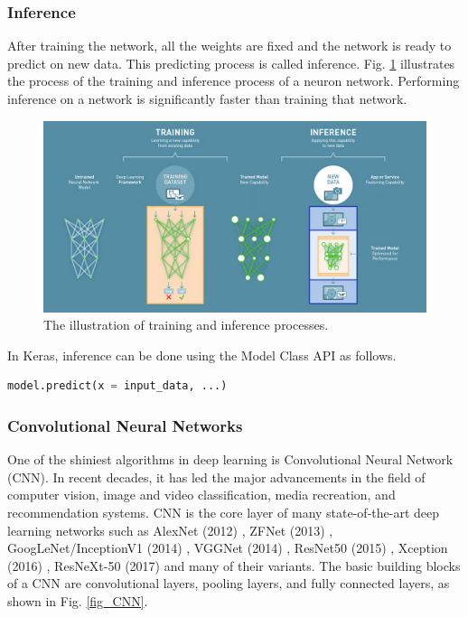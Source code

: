 \subsubsection{Inference}
After training the network, all the weights are fixed and the network is ready to predict on new data. This predicting process is called inference. Fig. \ref{fig_train_vs_infer} illustrates the process of the training and inference process of a neuron network. Performing inference on a network is significantly faster than training that network.
\begin{figure}[h!]
\begin{center}
\includegraphics[width = 13cm]{img/train_inference.jpg}
\caption[The illustration of training and inference processes]{The illustration of training and inference processes. \label{fig_train_vs_infer}}
\end{center}
\end{figure}

In Keras, inference can be done using the Model Class API as follows.
\begin{lstlisting}[language=python,frame=single]
model.predict(x = input_data, ...)
\end{lstlisting}

\subsubsection{Convolutional Neural Networks}
One of the shiniest algorithms in deep learning is Convolutional Neural Network (CNN). In recent decades, it has led the major advancements in the field of computer vision, image and video classification, media recreation, and recommendation systems. CNN is the core layer of many state-of-the-art deep learning networks such as AlexNet (2012) \cite{krizhevsky2012imagenet}, ZFNet (2013) \cite{zeiler2014visualizing}, GoogLeNet/InceptionV1 (2014) \cite{szegedy2015going}, VGGNet (2014) \cite{simonyan2014very}, ResNet50 (2015) \cite{he2016deep}, Xception (2016) \cite{chollet2017xception}, ResNeXt-50 (2017) \cite{xie2017aggregated} and many of their variants. The basic building blocks of a CNN are convolutional layers, pooling layers, and fully connected layers, as shown in Fig. \ref{fig_CNN}. 

